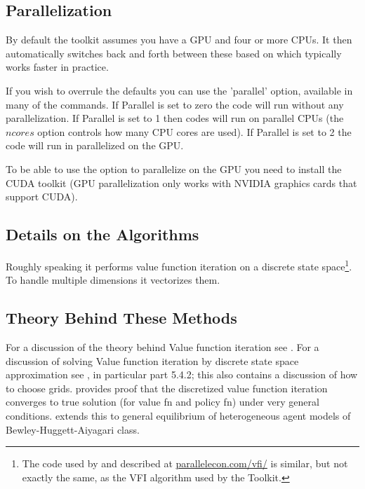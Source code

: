 \documentclass[11pt,fleqn]{article}
\begin{document}
\subsection{Parallelization}
By default the toolkit assumes you have a GPU and four or more CPUs. It then automatically switches back and forth between these based on which typically works faster in practice.

If you wish to overrule the defaults you can use the 'parallel' option, available in many of the commands. If Parallel is set to zero the code will run without any parallelization. If Parallel is set to 1 then codes will run on parallel CPUs (the $ncores$ option controls how many CPU cores are used). If Parallel is set to 2 the code will run in parallelized on the GPU.

To be able to use the option to parallelize on the GPU you need to install the CUDA toolkit (GPU parallelization only works with NVIDIA graphics cards that support CUDA). 

\subsection{Details on the Algorithms}
Roughly speaking it performs value function iteration on a discrete state space\footnote{The code used by \cite*{AldrichFernandezVillaverdeGallantRubioRamirez2011} and described at \href{http://www.parallelecon.com/vfi/}{parallelecon.com/vfi/} is similar, but not exactly the same, as the VFI algorithm used by the Toolkit.}. To handle multiple dimensions it vectorizes them.

\subsection{Theory Behind These Methods}
For a discussion of the theory behind Value function iteration see \cite*{SLP1989}. For a discussion of solving Value function iteration by discrete state space approximation see \cite{Burnside2001}, in particular part 5.4.2; this also contains a discussion of how to choose grids. \cite*{KirkbyVFIErrors} provides proof that the discretized value function iteration converges to true solution (for value fn and policy fn) under very general conditions. \cite*{KirkbyHeteroErrors} extends this to general equilibrium of heterogeneous agent models of Bewley-Huggett-Aiyagari class.
\end{document}
